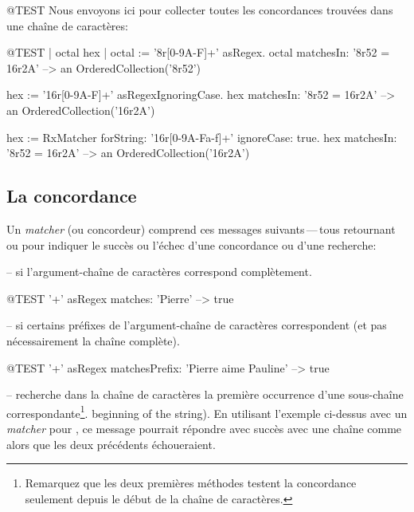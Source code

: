 \documentclass[a4paper,10pt,twoside]{book}
\begin{document}
\begin{code}{@TEST}
Nous envoyons ici  pour collecter toutes
les concordances trouvées dans une chaîne de caractères:

\begin{code}{@TEST | octal hex |}
octal := '8r[0-9A-F]+' asRegex.
octal matchesIn: '8r52 = 16r2A' --> an OrderedCollection('8r52')

hex := '16r[0-9A-F]+' asRegexIgnoringCase.
hex matchesIn: '8r52 = 16r2A'   --> an OrderedCollection('16r2A')

hex := RxMatcher forString: '16r[0-9A-Fa-f]+' ignoreCase: true.
hex matchesIn: '8r52 = 16r2A'   --> an OrderedCollection('16r2A')
\end{code}

\subsection{La concordance}

Un \emph{matcher} (ou concordeur) comprend ces messages suivants\,---\,tous
retournant  ou  pour indiquer le succès ou l'échec
d'une concordance ou d'une recherche:

  --  si l'argument-chaîne de
caractères  correspond complètement.

\begin{code}{@TEST}
'\w+' asRegex matches: 'Pierre' --> true
\end{code}

  --  si certains préfixes
de l'argument-chaîne de caractères  correspondent (et pas
nécessairement la chaîne complète).

\begin{code}{@TEST}
'\w+' asRegex matchesPrefix: 'Pierre aime Pauline' --> true
\end{code}

  -- recherche dans la chaîne de
caractères la première occurrence d'une sous-chaîne
correspondante\footnote{Remarquez que les deux premières méthodes
  testent la concordance seulement depuis le début de la chaîne de caractères.}.
beginning of the string).
En utilisant l'exemple ci-dessus avec un \emph{matcher} pour ,
ce message pourrait répondre avec succès avec une chaîne comme
 alors que les deux précédents échoueraient. %


\end{code}
\end{document}
